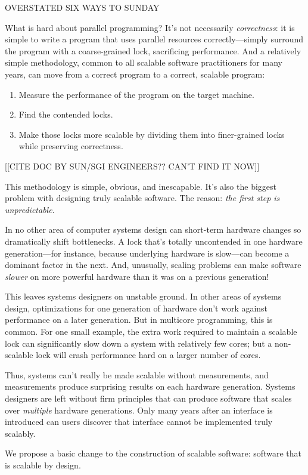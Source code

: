 OVERSTATED SIX WAYS TO SUNDAY

What is hard about parallel programming?
%
It's not necessarily \emph{correctness}: it is simple to write a program that uses parallel resources correctly---simply surround the program with a coarse-grained lock, sacrificing performance.
%
And a relatively simple methodology, common to all scalable software practitioners for many years, can move from a correct program to a correct, scalable program:

\begin{enumerate}
\item Measure the performance of the program on the target machine.
\item Find the contended locks.
\item Make those locks more scalable by dividing them into finer-grained locks while preserving correctness.
\end{enumerate}

[[CITE DOC BY SUN/SGI ENGINEERS?? CAN'T FIND IT NOW]]~\cite{cacm-real-world}

This methodology is simple, obvious, and inescapable. It's also the biggest problem with designing truly scalable software. The reason: \emph{the first step is unpredictable}.


In no other area of computer systems design can short-term hardware changes so dramatically shift bottlenecks. A lock that's totally uncontended in one hardware generation---for instance, because underlying hardware is slow---can become a dominant factor in the next. And, unusually, scaling problems can make software \emph{slower} on more powerful hardware than it was on a previous generation!

This leaves systems designers on unstable ground. In other areas of systems design, optimizations for one generation of hardware don't work against performance on a later generation. But in multicore programming, this is common. For one small example, the extra work required to maintain a scalable lock can significantly slow down a system with relatively few cores; but a non-scalable lock will crash performance hard on a larger number of cores.

Thus, systems can't really be made scalable without measurements, and measurements produce surprising results on each hardware generation. Systems designers are left without firm principles that can produce software that scales over \emph{multiple} hardware generations. Only many years after an interface is introduced can users discover that interface cannot be implemented truly scalably.

We propose a basic change to the construction of scalable software: software that is scalable by design.
